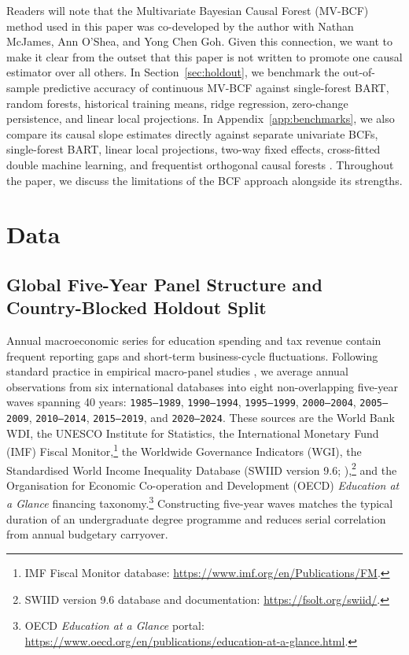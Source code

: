 \documentclass[11pt,a4paper]{article}
\begin{document}
Readers will note that the Multivariate Bayesian Causal Forest (MV-BCF) method used in this paper \citep{mcjames2024mvbcf} was co-developed by the author with Nathan McJames, Ann O'Shea, and Yong Chen Goh. Given this connection, we want to make it clear from the outset that this paper is not written to promote one causal estimator over all others. In Section~\ref{sec:holdout}, we benchmark the out-of-sample predictive accuracy of continuous MV-BCF against single-forest BART, random forests, historical training means, ridge regression, zero-change persistence, and linear local projections. In Appendix~\ref{app:benchmarks}, we also compare its causal slope estimates directly against separate univariate BCFs, single-forest BART, linear local projections, two-way fixed effects, cross-fitted double machine learning, and frequentist orthogonal causal forests \citep{athey2019generalized}. Throughout the paper, we discuss the limitations of the BCF approach alongside its strengths.

\section{Data}
\label{sec:data}

\subsection{Global Five-Year Panel Structure and Country-Blocked Holdout Split}

Annual macroeconomic series for education spending and tax revenue contain frequent reporting gaps and short-term business-cycle fluctuations. Following standard practice in empirical macro-panel studies \citep{acemoglu2019democracy}, we average annual observations from six international databases into eight non-overlapping five-year waves spanning 40 years: \texttt{1985--1989}, \texttt{1990--1994}, \texttt{1995--1999}, \texttt{2000--2004}, \texttt{2005--2009}, \texttt{2010--2014}, \texttt{2015--2019}, and \texttt{2020--2024}. These sources are the World Bank WDI, the UNESCO Institute for Statistics, the International Monetary Fund (IMF) Fiscal Monitor,\footnote{IMF Fiscal Monitor database: \url{https://www.imf.org/en/Publications/FM}.} the Worldwide Governance Indicators (WGI), the Standardised World Income Inequality Database (SWIID version 9.6; \citealt{solt2020swiid}),\footnote{SWIID version 9.6 database and documentation: \url{https://fsolt.org/swiid/}.} and the Organisation for Economic Co-operation and Development (OECD) \emph{Education at a Glance} financing taxonomy.\footnote{OECD \emph{Education at a Glance} portal: \url{https://www.oecd.org/en/publications/education-at-a-glance.html}.} Constructing five-year waves matches the typical duration of an undergraduate degree programme and reduces serial correlation from annual budgetary carryover.
\end{document}
